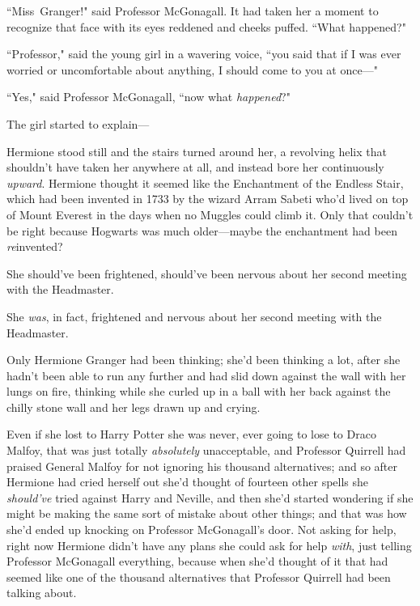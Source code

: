 ``Miss~Granger!" said Professor McGonagall. It had taken her a moment to recognize that face with its eyes reddened and cheeks puffed. ``What happened?"

``Professor," said the young girl in a wavering voice, ``you said that if I was ever worried or uncomfortable about anything, I should come to you at once—"

``Yes," said Professor McGonagall, ``now what \emph{happened}?"

The girl started to explain—

\later

Hermione stood still and the stairs turned around her, a revolving helix that shouldn't have taken her anywhere at all, and instead bore her continuously \emph{upward}. Hermione thought it seemed like the Enchantment of the Endless Stair, which had been invented in 1733 by the wizard Arram Sabeti who'd lived on top of Mount Everest in the days when no Muggles could climb it. Only that couldn't be right because Hogwarts was much older—maybe the enchantment had been \emph{re}invented?

She should've been frightened, should've been nervous about her second meeting with the Headmaster.

She \emph{was}, in fact, frightened and nervous about her second meeting with the Headmaster.

Only Hermione Granger had been thinking; she'd been thinking a lot, after she hadn't been able to run any further and had slid down against the wall with her lungs on fire, thinking while she curled up in a ball with her back against the chilly stone wall and her legs drawn up and crying.

Even if she lost to Harry Potter she was never, ever going to lose to Draco Malfoy, that was just totally \emph{absolutely} unacceptable, and Professor Quirrell had praised General Malfoy for not ignoring his thousand alternatives; and so after Hermione had cried herself out she'd thought of fourteen other spells she \emph{should've} tried against Harry and Neville, and then she'd started wondering if she might be making the same sort of mistake about other things; and that was how she'd ended up knocking on Professor McGonagall's door. Not asking for help, right now Hermione didn't have any plans she could ask for help \emph{with}, just telling Professor McGonagall everything, because when she'd thought of it that had seemed like one of the thousand alternatives that Professor Quirrell had been talking about.

